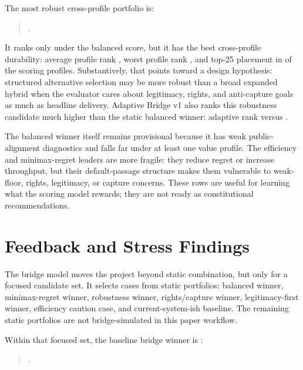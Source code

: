 \documentclass[11pt]{article}
\providecommand{\GeneratedDir}{generated}
\begin{document}
The most robust cross-profile portfolio is:

\begin{quote}
\RobustWinnerName.
\end{quote}

It ranks only \RobustWinnerBalancedRank{} under the balanced score, but it has the best cross-profile durability: average profile rank \RobustWinnerAverageProfileRank, worst profile rank \RobustWinnerWorstProfileRank, and top-25 placement in \RobustWinnerTopTwentyFiveCount{} of the \ScoringProfileCount{} scoring profiles. Substantively, that points toward a design hypothesis: structured alternative selection may be more robust than a broad expanded hybrid when the evaluator cares about legitimacy, rights, and anti-capture goals as much as headline delivery. Adaptive Bridge v1 also ranks this robustness candidate much higher than the static balanced winner: adaptive rank \RobustAdaptiveRank{} versus \BalancedAdaptiveRank.

The balanced winner itself remains provisional because it has weak public-alignment diagnostics and falls far under at least one value profile. The efficiency and minimax-regret leaders are more fragile: they reduce regret or increase throughput, but their default-passage structure makes them vulnerable to weak-floor, rights, legitimacy, or capture concerns. These rows are useful for learning what the scoring model rewards; they are not ready as constitutional recommendations.

\section{Feedback and Stress Findings}

The bridge model moves the project beyond static combination, but only for a focused candidate set. It selects \BridgeCaseCount{} cases from \PortfolioCount{} static portfolios: balanced winner, minimax-regret winner, robustness winner, rights/capture winner, legitimacy-first winner, efficiency caution case, and current-system-ish baseline. The remaining \BridgeUnmodeledPortfolioCount{} static portfolios are not bridge-simulated in this paper workflow.




Within that focused set, the baseline bridge winner is \BaselineBridgeWinnerName:

\begin{quote}
\BaselineBridgeWinnerPortfolio.
\end{quote}
\end{document}
